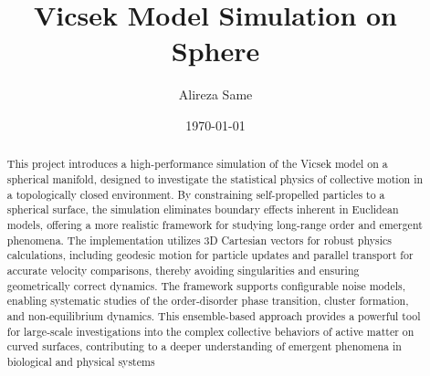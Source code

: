 \documentclass[12pt,a4paper]{article}
\title{Vicsek Model Simulation on Sphere}
\author{Alireza Same}
\date{\today}
\begin{document}
\maketitle

\begin{abstract}
This project introduces a high-performance simulation of the Vicsek model on a spherical manifold, designed to investigate the statistical physics of collective motion in a topologically closed environment. By constraining self-propelled particles to a spherical surface, the simulation eliminates boundary effects inherent in Euclidean models, offering a more realistic framework for studying long-range order and emergent phenomena. The implementation utilizes 3D Cartesian vectors for robust physics calculations, including geodesic motion for particle updates and parallel transport for accurate velocity comparisons, thereby avoiding singularities and ensuring geometrically correct dynamics. The framework supports configurable noise models, enabling systematic studies of the order-disorder phase transition, cluster formation, and non-equilibrium dynamics. This ensemble-based approach provides a powerful tool for large-scale investigations into the complex collective behaviors of active matter on curved surfaces, contributing to a deeper understanding of emergent phenomena in biological and physical systems\end{abstract}
\end{document}
